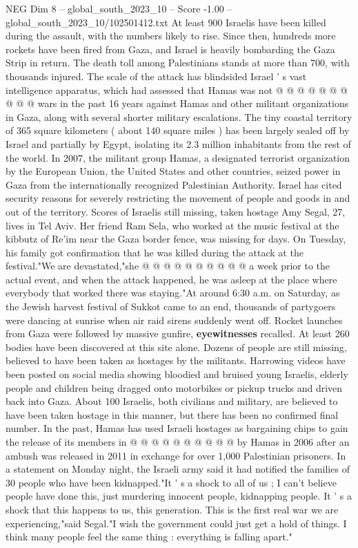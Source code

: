 \begin{textsample}{NEG Dim 8 – global\_south\_2023\_10 – Score -1.00 – global\_south\_2023\_10/102501412.txt}
At least 900 Israelis have been killed during the assault, with the numbers likely to rise.
Since then, hundreds more rockets have been fired from Gaza, and Israel is heavily bombarding the Gaza Strip in return.
The death toll among Palestinians stands at more than 700, with thousands injured.
The scale of the attack has blindsided Israel ' s vast intelligence apparatus, which had assessed that Hamas was not @ @ @ @ @ @ @ @ @ @ wars in the past 16 years against Hamas and other militant organizations in Gaza, along with several shorter military escalations.
The tiny coastal territory of 365 square kilometers ( about 140 square miles ) has been largely sealed off by Israel and partially by Egypt, isolating its 2.3 million inhabitants from the rest of the world.
In 2007, the militant group Hamas, a designated terrorist organization by the European Union, the United States and other countries, seized power in Gaza from the internationally recognized Palestinian Authority.
Israel has cited security reasons for severely restricting the movement of people and goods in and out of the territory.
Scores of Israelis still missing, taken hostage Amy Segal, 27, lives in Tel Aviv.
Her friend Ram Sela, who worked at the music festival at the kibbutz of Re'im near the Gaza border fence, was missing for days.
On Tuesday, his family got confirmation that he was killed during the attack at the festival."We are devastated,"she @ @ @ @ @ @ @ @ @ @ a week prior to the actual event, and when the attack happened, he was asleep at the place where everybody that worked there was staying."At around 6:30 a.m. on Saturday, as the Jewish harvest festival of Sukkot came to an end, thousands of partygoers were dancing at sunrise when air raid sirens suddenly went off.
Rocket launches from Gaza were followed by massive gunfire, \textbf{eyewitnesses} recalled.
At least 260 bodies have been discovered at this site alone.
Dozens of people are still missing, believed to have been taken as hostages by the militants.
Harrowing videos have been posted on social media showing bloodied and bruised young Israelis, elderly people and children being dragged onto motorbikes or pickup trucks and driven back into Gaza.
About 100 Israelis, both civilians and military, are believed to have been taken hostage in this manner, but there has been no confirmed final number.
In the past, Hamas has used Israeli hostages as bargaining chips to gain the release of its members in @ @ @ @ @ @ @ @ @ @ by Hamas in 2006 after an ambush was released in 2011 in exchange for over 1,000 Palestinian prisoners.
In a statement on Monday night, the Israeli army said it had notified the families of 30 people who have been kidnapped."It ' s a shock to all of us ; I can't believe people have done this, just murdering innocent people, kidnapping people.
It ' s a shock that this happens to us, this generation.
This is the first real war we are experiencing,"said Segal."I wish the government could just get a hold of things.
I think many people feel the same thing : everything is falling apart."

\end{textsample}
